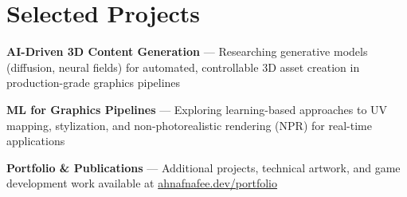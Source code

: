 \documentclass[letterpaper,10pt]{article}
\begin{document}
\section*{Selected Projects}
\begin{tightitemize}
\item \textbf{AI-Driven 3D Content Generation} --- Researching generative models (diffusion, neural fields) for automated, controllable 3D asset creation in production-grade graphics pipelines
\item \textbf{ML for Graphics Pipelines} --- Exploring learning-based approaches to UV mapping, stylization, and non-photorealistic rendering (NPR) for real-time applications
\item \textbf{Portfolio \& Publications} --- Additional projects, technical artwork, and game development work available at \href{https://www.ahnafnafee.dev/portfolio}{ahnafnafee.dev/portfolio}
\end{tightitemize}
\end{document}
